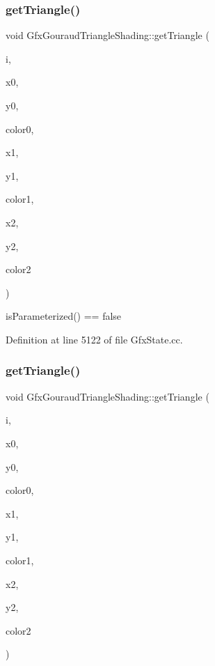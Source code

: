 \subsubsection{\texorpdfstring{get\+Triangle()}{getTriangle()}\hspace{0.1cm}{\footnotesize\ttfamily [1/2]}}
{\footnotesize\ttfamily void Gfx\+Gouraud\+Triangle\+Shading\+::get\+Triangle (\begin{DoxyParamCaption}\item[{int}]{i,  }\item[{double $\ast$}]{x0,  }\item[{double $\ast$}]{y0,  }\item[{\hyperlink{struct_gfx_color}{Gfx\+Color} $\ast$}]{color0,  }\item[{double $\ast$}]{x1,  }\item[{double $\ast$}]{y1,  }\item[{\hyperlink{struct_gfx_color}{Gfx\+Color} $\ast$}]{color1,  }\item[{double $\ast$}]{x2,  }\item[{double $\ast$}]{y2,  }\item[{\hyperlink{struct_gfx_color}{Gfx\+Color} $\ast$}]{color2 }\end{DoxyParamCaption})}

is\+Parameterized() == false 

Definition at line 5122 of file Gfx\+State.\+cc.

\mbox{\label{class_gfx_gouraud_triangle_shading_a25a761bc76108570b8ebee7c8d1012e6}} 
\subsubsection{\texorpdfstring{get\+Triangle()}{getTriangle()}\hspace{0.1cm}{\footnotesize\ttfamily [2/2]}}
{\footnotesize\ttfamily void Gfx\+Gouraud\+Triangle\+Shading\+::get\+Triangle (\begin{DoxyParamCaption}\item[{int}]{i,  }\item[{double $\ast$}]{x0,  }\item[{double $\ast$}]{y0,  }\item[{double $\ast$}]{color0,  }\item[{double $\ast$}]{x1,  }\item[{double $\ast$}]{y1,  }\item[{double $\ast$}]{color1,  }\item[{double $\ast$}]{x2,  }\item[{double $\ast$}]{y2,  }\item[{double $\ast$}]{color2 }\end{DoxyParamCaption})}

